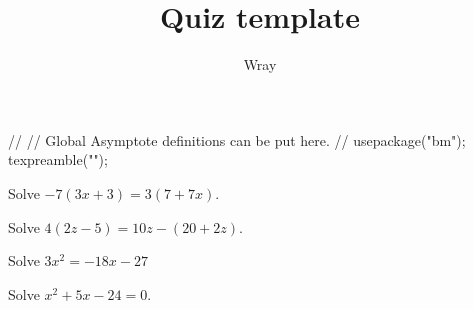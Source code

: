 \documentclass[addpoints, 12pt]{exam}
\title{Quiz template}
\author{Wray}
\begin{document}
\begin{asydef}
//
// Global Asymptote definitions can be put here.
//
usepackage("bm");
texpreamble("\def\V#1{\bm{#1}}");
\end{asydef}



\bigskip

             
\bigskip
\bigskip

\smallskip

\begin{questions}

\question[5]
Solve $-7 \left( 3x + 3 \right) = 3 \left( 7 + 7x \right)$.


\question[5]

Solve $4 \left( 2z - 5 \right) = 10z - \left( 20 + 2z \right)  $.


\newpage

\question[5]
Solve $3x^2 = -18x - 27$


\question[5]
Solve $x^2 + 5x - 24 = 0$.


\end{questions}
\end{document}

